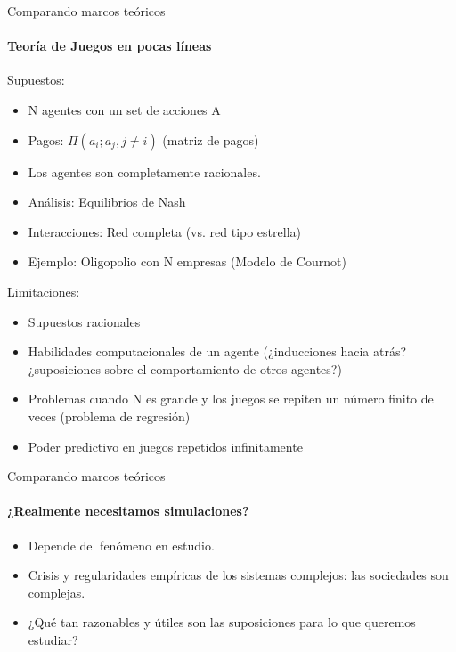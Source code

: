 \documentclass[11pt]{beamer}
\begin{document}
\begin{frame}
\begin{frame}{Comparando marcos teóricos}
\framesubtitle{Teoría de Juegos en pocas líneas}
\begin{multicols}{2}
Supuestos:
\begin{itemize}
    \footnotesize \item N agentes con un set de acciones A
\item Pagos: $\Pi (a_i ; a_j , j \neq i)$ (matriz de pagos)
\item Los agentes son completamente racionales.
\item Análisis: Equilibrios de Nash
\item Interacciones: Red completa (vs. red tipo estrella)
\item Ejemplo: Oligopolio con N empresas (Modelo de Cournot)
\end{itemize}
\newpage
Limitaciones:
\begin{itemize}
    \footnotesize \item Supuestos racionales
\item Habilidades computacionales de un agente (¿inducciones hacia atrás? ¿suposiciones sobre el comportamiento de otros agentes?)
\item Problemas cuando N es grande y los juegos se repiten un número finito de veces (problema de regresión)
\item Poder predictivo en juegos repetidos infinitamente
\end{itemize}
\end{multicols}    
\end{frame}

\begin{frame}{Comparando marcos teóricos}
\framesubtitle{¿Realmente necesitamos simulaciones?}
    \begin{itemize}
        \item Depende del fenómeno en estudio.
\item Crisis y regularidades empíricas de los sistemas complejos: las sociedades son complejas.
\item ¿Qué tan razonables y útiles son las suposiciones para lo que queremos estudiar?
    \end{itemize}
\end{frame}


\end{frame}
\end{document}
